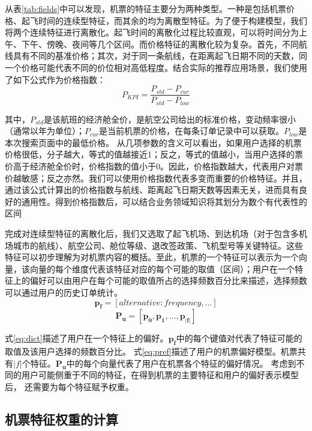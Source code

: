 从表\ref{tab:fields}中可以发现，机票的特征主要分为两种类型。一种是包括机票价格、起飞时间的连续型特征，而其余的均为离散型特征。为了便于构建模型，我们将两个连续特征进行离散化。起飞时间的离散化过程比较直观，可以将时间分为上午、下午、傍晚、夜间等几个区间。而价格特征的离散化较为复杂。首先，不同航线具有不同的基准价格；其次，对于同一条航线，在距离起飞日期不同的天数，同一个价格可能代表不同的价位相对高低程度。结合实际的推荐应用场景，我们使用了如下公式作为价格指数：\\
\begin{equation}
	P_{KPI} = \frac{P_{std} - P_{cur}}{P_{std} - P_{low}}
\end{equation}\par
其中，$P_{std}$是该航班的经济舱全价，是航空公司给出的标准价格，变动频率很小（通常以年为单位）；$P_{cur}$是当前机票的价格，在每条订单记录中可以获取。$P_{low}$是本次搜索页面中的最低价格。
从几项参数的含义可以看出，如果用户选择的机票价格很低，分子越大，等式的值越接近1；反之，等式的值越小，当用户选择的票价高于经济舱全价时，价格指数的值小于0。因此，价格指数越大，代表用户对票价越敏感；反之亦然。我们可以使用价格指数代表多变而重要的价格特征。并且，通过该公式计算出的价格指数与航线、距离起飞日期天数等因素无关，进而具有良好的通用性。得到价格指数后，可以结合业务领域知识将其划分为数个有代表性的区间\par
完成对连续型特征的离散化后，我们又选取了起飞机场、到达机场（对于包含多机场城市的航线）、航空公司、舱位等级、退改签政策、飞机型号等关键特征。这些特征可以初步理解为对机票内容的概括。至此，机票的一个特征可以表示为一个向量，该向量的每个维度代表该特征对应的每个可能的取值（区间）；用户在一个特征上的偏好可以由用户在每个可能的取值所占的选择频数百分比来描述，选择频数可以通过用户的历史订单统计。\\
\begin{equation}
\label{eq:dict}
	\mathbf{p_f} = [alternative:frequency,\dots]
\end{equation}
\begin{equation}
\label{eq:pref}
	\mathbf{P_u} = [\mathbf{p_0},\mathbf{p_1},\dots,\mathbf{p_{|f|}}]
\end{equation}\par
式\ref{eq:dict}描述了用户在一个特征上的偏好。$\mathbf{p_f}$中的每个键值对代表了特征可能的取值及该用户选择的频数百分比。
式\ref{eq:pref}描述了用户的机票偏好模型。机票共有$|f|$个特征。$\mathbf{P_u}$中的每个向量代表了用户在机票各个特征的偏好情况。
考虑到不同的用户可能侧重于不同的特征，在得到机票的主要特征和用户的偏好表示模型后，
还需要为每个特征赋予权重。

\subsection{机票特征权重的计算}

